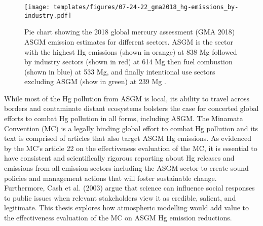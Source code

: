 \begin{figure}[H]
  \texttt{[image: templates/figures/07-24-22\_gma2018\_hg-emissions\_by-industry.pdf]}
  \centering
  \caption{Pie chart showing the 2018 global mercury assessment (GMA 2018) ASGM \hg emission estimates for different sectors. ASGM is the sector with the highest Hg emissions (shown in orange) at 838 Mg followed by industry sectors (shown in red) at 614 Mg then fuel combustion (shown in blue) at 533 Mg, and finally intentional use sectors excluding ASGM (show in green) at 239 Mg \cite{united_nations_environment_programme_technical_2019}.}
  \label{fig:gma2018_hg-emissions_by-industry}
\end{figure}
\FloatBarrier
\begin{flushleft}
While most of the Hg pollution from ASGM is local, its ability to travel across borders and contaminate distant ecosystems bolsters the case for concerted global efforts to combat Hg pollution in all forms, including ASGM. The Minamata Convention (MC) is a legally binding global effort to combat Hg pollution and its text is comprised of articles that also target ASGM Hg emissions\cite{unep_minamata_2013}. As evidenced by the MC's article 22 on the effectiveness evaluation of the MC, it is essential to have consistent and scientifically rigorous reporting about Hg releases and emissions from all emission sectors including the ASGM sector to create sound policies and management actions that will foster sustainable change. Furthermore, Cash et al. (2003) argue that science can influence social responses to public issues when relevant stakeholders view it as credible, salient, and legitimate\cite{cash_salience_2003}. This thesis explores how atmospheric modelling would add value to the effectiveness evaluation of the MC on ASGM Hg emission reductions. 
\end{flushleft}
